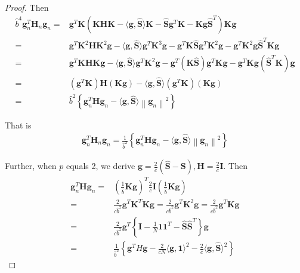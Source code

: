 \documentclass[sigconf]{acmart}
\begin{document}
\begin{proof}
Then
\begin{align}
    \hat{b}^4 \mathbf{g}_n^T\mathbf{H}_n\mathbf{g}_n = &  {\mathbf{g}}^T\mathbf{K}\left(\mathbf{K}\mathbf{H}\mathbf{K}-\langle{\mathbf{g}},\hat{\mathbf{S}}\rangle\mathbf{K}-\hat{\mathbf{S}}{\mathbf{g}}^T\mathbf{K}-\mathbf{K}{\mathbf{g}}\hat{\mathbf{S}}^T\right)\mathbf{K}{\mathbf{g}} \nonumber\\
    = & {\mathbf{g}}^T\mathbf{K}^2\mathbf{H}\mathbf{K}^2{\mathbf{g}}-\langle{\mathbf{g}},\hat{\mathbf{S}}\rangle{\mathbf{g}}^T\mathbf{K}^3{\mathbf{g}}-{\mathbf{g}}^T\mathbf{K}\hat{\mathbf{S}}{\mathbf{g}}^T\mathbf{K}^2{\mathbf{g}}-{\mathbf{g}}^T\mathbf{K}^2{\mathbf{g}}\hat{\mathbf{S}}^T\mathbf{K}{\mathbf{g}} \nonumber\\
    = & {\mathbf{g}}^T\mathbf{K}\mathbf{H}\mathbf{K}{\mathbf{g}}-\langle{\mathbf{g}},\hat{\mathbf{S}}\rangle{\mathbf{g}}^T\mathbf{K}^2{\mathbf{g}}-{\mathbf{g}}^T(\mathbf{K}\hat{\mathbf{S}}){\mathbf{g}}^T\mathbf{K}{\mathbf{g}}-{\mathbf{g}}^T\mathbf{K}{\mathbf{g}}(\hat{\mathbf{S}}^T\mathbf{K}){\mathbf{g}}\nonumber\\
    = & ({\mathbf{g}}^T\mathbf{K})\mathbf{H}(\mathbf{K}{\mathbf{g}})-\langle{\mathbf{g}},\hat{\mathbf{S}}\rangle({\mathbf{g}}^T\mathbf{K})(\mathbf{K}{\mathbf{g}})\nonumber\\
    = & \hat{b}^2 \left\{\mathbf{g}_n^T\mathbf{H}\mathbf{g}_n-\langle{\mathbf{g}},\hat{\mathbf{S}}\rangle\left\|\mathbf{g}_n\right\|^2\right\}
\end{align}

That is
\begin{align}\label{eq:beta-smoothness}
    \mathbf{g}_n^T\mathbf{H}_n\mathbf{g}_n = \frac{1}{\hat{b}^2} \left\{\mathbf{g}_n^T\mathbf{H}\mathbf{g}_n-\langle{\mathbf{g}},\hat{\mathbf{S}}\rangle\left\|\mathbf{g}_n\right\|^2\right\}
\end{align}

Further, when $p$ equals 2, we derive ${\mathbf{g}} =\frac{2}{c}(\hat{\mathbf{S}}-{\mathbf{S}}), \mathbf{H}=\frac{2}{c}\mathbf{I}$. Then
\begin{align}
\mathbf{g}_n^T\mathbf{H}\mathbf{g}_n = & \left(\frac{1}{\hat{b}}\mathbf{K}{\mathbf{g}}\right)^T\frac{2}{c}\mathbf{I}\left(\frac{1}{\hat{b}}\mathbf{K}{\mathbf{g}}\right)\nonumber\\
= & \frac{2}{c\hat{b}^2}{\mathbf{g}}^T\mathbf{K}^T\mathbf{K}{\mathbf{g}} = \frac{2}{c\hat{b}^2}{\mathbf{g}}^T\mathbf{K}^2{\mathbf{g}} = \frac{2}{c\hat{b}^2}{\mathbf{g}}^T\mathbf{K}{\mathbf{g}} \nonumber\\
= & \frac{2}{c\hat{b}^2}{\mathbf{g}}^T\left\{\mathbf{I}-\frac{1}{N}\mathbf{1}\mathbf{1}^T-\hat{\mathbf{S}}\hat{\mathbf{S}}^T\right\}{\mathbf{g}} \nonumber\\
= & \frac{1}{\hat{b}^2}\left\{{\mathbf{g}}^TH{\mathbf{g}}-\frac{2}{cN}\langle{\mathbf{g}},\mathbf{1}\rangle^2-\frac{2}{c}\langle{\mathbf{g}},\hat{\mathbf{S}}\rangle^2\right\}
\end{align}


\end{proof}
\end{document}
